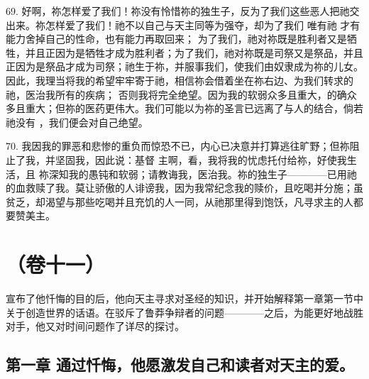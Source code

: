 69. 好啊，祢怎样爱了我们！祢没有怜惜祢的独生子，反为了我们这些恶人把祂交出来。祢怎样爱了我们！祂不以自己与天主同等为强夺，却为了我们  唯有祂 才有能力舍掉自己的性命，也有能力再取回来； 为了我们，祂对祢既是胜利者又是牺牲，并且正因为是牺牲才成为胜利者；为了我们，祂对祢既是司祭又是祭品，并且正因为是祭品才成为司祭；祂生于祢，并服事我们，使我们由奴隶成为祢的儿女。因此，我理当将我的希望牢牢寄于祂，相信祢会借着坐在祢右边、为我们转求的祂，医治我所有的疾病；  否则我将完全绝望。因为我的软弱众多且重大，的确众多且重大；但祢的医药更伟大。我们可能以为祢的圣言已远离了与人的结合，倘若祂没有 ，我们便会对自己绝望。\par

70. 我因我的罪恶和悲惨的重负而惊恐不已，内心已决意并打算逃往旷野；但祢阻止了我，并坚固我，因此说：基督  主啊，看，我将我的忧虑托付给祢，好使我生活，且 祢深知我的愚钝和软弱；请教诲我，医治我。祢的独生子————已用祂的血救赎了我。莫让骄傲的人诽谤我，因为我常纪念我的赎价，且吃喝并分施；虽贫乏，却渴望与那些吃喝并且充饥的人一同，从祂那里得到饱饫，凡寻求主的人都要赞美主。\par



\section{（卷十一）}

宣布了他忏悔的目的后，他向天主寻求对圣经的知识，并开始解释第一章第一节中关于创造世界的话语。在驳斥了鲁莽争辩者的问题————之后，为能更好地战胜对手，他又对时间问题作了详尽的探讨。\par


\subsection{第一章 通过忏悔，他愿激发自己和读者对天主的爱。}

